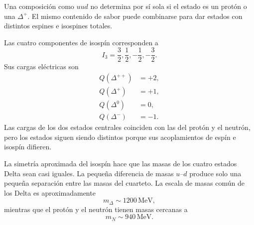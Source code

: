 Una composición como \(uud\) no determina por sí sola si el estado es un protón o una \(\Delta^+\). El mismo contenido de sabor puede combinarse para dar estados con distintos espines e isospines totales.

\begin{classroomqa}
\end{classroomqa}

\begin{classroomqa}
\end{classroomqa}

Las cuatro componentes de isospín corresponden a
\begin{equation}
I_3=\frac32,\frac12,-\frac12,-\frac32.
\end{equation}
Sus cargas eléctricas son
\begin{align}
Q(\Delta^{++})&=+2,\\
Q(\Delta^{+})&=+1,\\
Q(\Delta^{0})&=0,\\
Q(\Delta^{-})&=-1.
\end{align}
Las cargas de los dos estados centrales coinciden con las del protón y el neutrón, pero los estados siguen siendo distintos porque sus acoplamientos de espín e isospín difieren.

La simetría aproximada del isospín hace que las masas de los cuatro estados Delta sean casi iguales. La pequeña diferencia de masas \(u\)--\(d\) produce solo una pequeña separación entre las masas del cuarteto. La escala de masas común de los Delta es aproximadamente
\begin{equation}
m_\Delta\sim1200\,\mathrm{MeV},
\end{equation}
mientras que el protón y el neutrón tienen masas cercanas a
\begin{equation}
m_N\sim940\,\mathrm{MeV}.
\end{equation}


